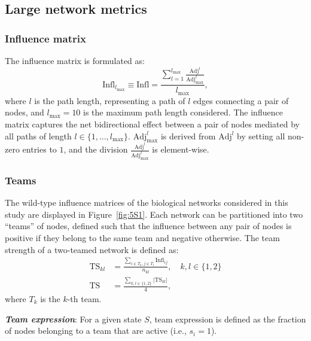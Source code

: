 \documentclass[11pt]{article}
\newcommand{\ts}{\mathrm{TS}}
\newcommand{\inm}{\mathrm{Infl}}
\newcommand{\adj}{\mathrm{Adj}}
\begin{document}
\subsection{Large network metrics}

\subsubsection{Influence matrix}
The influence matrix is formulated as:
\begin{equation}
    \inm_{l_\mathrm{max}} \equiv \inm = \frac{\sum_{l=1}^{l_\mathrm{max}} \frac{\adj^l}{\adj_{\mathrm{max}}^l}}{l_\mathrm{max}},
\end{equation}
where $l$ is the path length, representing a path of $l$ edges connecting a pair of nodes, and $l_\mathrm{max} = 10$ is the maximum path length considered. The influence matrix captures the net bidirectional effect between a pair of nodes mediated by all paths of length $l \in \{1, \ldots, l_\mathrm{max}\}$. $\adj_{\mathrm{max}}^l$ is derived from $\adj^l$ by setting all non-zero entries to $1$, and the division $\frac{\adj^l}{\adj_{\mathrm{max}}^l}$ is element-wise.

\subsubsection{Teams}
The wild-type influence matrices of the biological networks considered in this study are displayed in Figure~\ref{fig:5S1}. Each network can be partitioned into two ``teams'' of nodes, defined such that the influence between any pair of nodes is positive if they belong to the same team and negative otherwise. The team strength of a two-teamed network is defined as:
\begin{align} \label{eq:ts_def}
    \ts_{kl} &= \frac{\sum_{i \in T_k, j \in T_l} \inm_{ij}}{n_{kl}}, \quad k, l \in \{1, 2\} \\
    \ts &= \frac{\sum_{k,l \in \{1,2\}} |\ts_{kl}|}{4},
\end{align}
where $T_k$ is the $k$-th team.

\noindent\textbf{\textit{Team expression}}\label{text:team_exp}: For a given state $S$, team expression is defined as the fraction of nodes belonging to a team that are active (i.e., $s_i = 1$).

\end{document}
